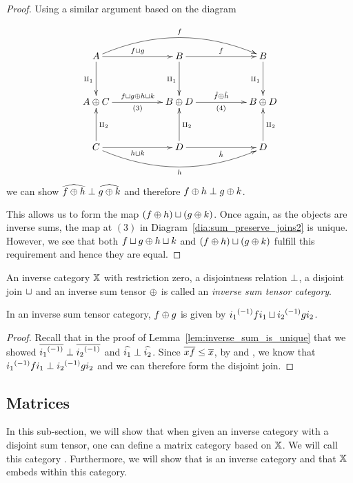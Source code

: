 \begin{proof}
  Using a similar argument based on the diagram

  \begin{equation}
    \xymatrix@R+10pt@C+28pt {
      A \ar[r]^{f\djoin g} \ar[d]_{\cpa} \ar@/^20pt/[rr]^f
        & B \ar[r]^{f} \ar[d]_{\cpa}  & B \ar[d]_{\cpa}\\
      A\+C  \ar[r]^{f\djoin g \+ h\djoin k}_{(3)}
        & B\+D \ar[r]^{\rg{f}\+\rg{h}}_{(4)}   & B \+D \\
      C  \ar[r]_{h\djoin k} \ar[u]_{\cpb} \ar@/_20pt/[rr]_h
        & D\ar[r]_{\rg{h}} \ar[u]_{\cpb}  & D \ar[u]_{\cpb}
    }\label{dia:sum_preserve_joins2}
  \end{equation}
  we can show $\widehat{f\oplus h} \perp \widehat{g\oplus k}$ and therefore $f\oplus h \perp g\oplus k$.

  This allows us to form the map $(f\oplus h) \sqcup (g\oplus k)$. Once again, as the objects are inverse
  sums, the map at $(3)$ in Diagram~\ref{dia:sum_preserve_joins2} is unique.
  However, we see that both $f\sqcup g \oplus h\sqcup k$ and $(f\oplus h) \sqcup (g\oplus k)$ fulfill this
  requirement and hence they are equal.
\end{proof}


\begin{definition}\label{def:inverse_sum_tensor_category}
  An inverse category $\mathbb{X}$ with restriction zero, a disjointness relation $\perp$, a disjoint
  join $\sqcup$ and an inverse sum tensor $\oplus$ is called an \emph{inverse sum tensor category}.
\end{definition}

\begin{corollary}\label{cor:inverse_sum_of_maps_is_disjoint_join}
  In an inverse sum tensor category, $f \oplus g$ is given by ${i_1}^{(-1)} f i_1 \sqcup {i_2}^{(-1)} g i_2$.
\end{corollary}
\begin{proof}
  Recall that in the proof of Lemma~\ref{lem:inverse_sum_is_unique} that we showed $\overline{{i_1}^{(-1)}}
  \perp \overline{{i_2}^{(-1)}}$ and $\widehat{i_1}\perp \widehat{i_2}$. Since $\overline{x f} \le \overline{x}$, by
   and , we know that ${i_1}^{(-1)} f i_1 \perp {i_2}^{(-1)} g i_2$ and we
  can therefore form the disjoint join.
\end{proof}


\subsection{Matrices} %
\label{sub:matrix_representation}
In this sub-section, we will show that when given an inverse  category \X with a disjoint sum
tensor, one can define a
matrix category based on $\mathbb{X}$. We will call this category \imatx. Furthermore, we will
show that \imatx is an inverse category and that $\mathbb{X}$ embeds within this category.

